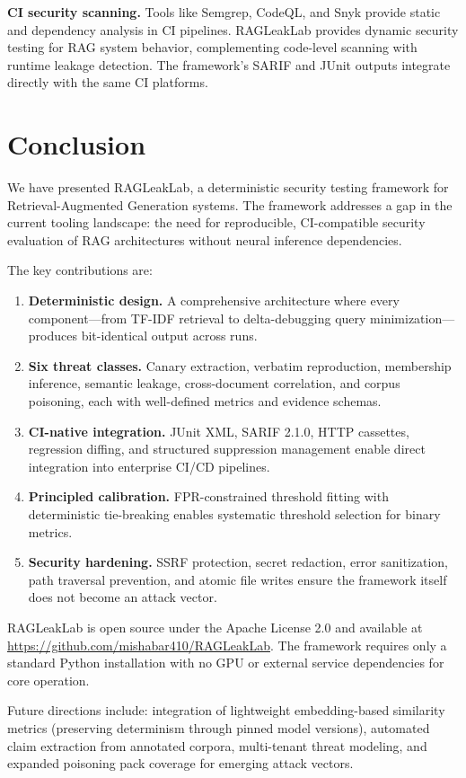 \documentclass[11pt,a4paper]{article}
\begin{document}
\textbf{CI security scanning.} Tools like Semgrep, CodeQL, and Snyk
provide static and dependency analysis in CI pipelines. RAGLeakLab
provides dynamic security testing for RAG system behavior, complementing
code-level scanning with runtime leakage detection. The framework's SARIF
and JUnit outputs integrate directly with the same CI platforms.

\section{Conclusion}\label{sec:conclusion}

We have presented RAGLeakLab, a deterministic security testing framework
for Retrieval-Augmented Generation systems. The framework addresses a gap
in the current tooling landscape: the need for reproducible, CI-compatible
security evaluation of RAG architectures without neural inference
dependencies.

The key contributions are:

\begin{enumerate}[nosep]
  \item \textbf{Deterministic design.} A comprehensive architecture where
        every component---from TF-IDF retrieval to delta-debugging query
        minimization---produces bit-identical output across runs.
  \item \textbf{Six threat classes.} Canary extraction, verbatim
        reproduction, membership inference, semantic leakage, cross-document
        correlation, and corpus poisoning, each with well-defined metrics
        and evidence schemas.
  \item \textbf{CI-native integration.} JUnit XML, SARIF 2.1.0, HTTP
        cassettes, regression diffing, and structured suppression
        management enable direct integration into enterprise CI/CD
        pipelines.
  \item \textbf{Principled calibration.} FPR-constrained threshold
        fitting with deterministic tie-breaking enables systematic
        threshold selection for binary metrics.
  \item \textbf{Security hardening.} SSRF protection, secret redaction,
        error sanitization, path traversal prevention, and atomic file
        writes ensure the framework itself does not become an attack
        vector.
\end{enumerate}

RAGLeakLab is open source under the Apache License 2.0 and available at
\url{https://github.com/mishabar410/RAGLeakLab}. The framework requires
only a standard Python installation with no GPU or external service
dependencies for core operation.

Future directions include: integration of lightweight embedding-based
similarity metrics (preserving determinism through pinned model versions),
automated claim extraction from annotated corpora, multi-tenant threat
modeling, and expanded poisoning pack coverage for emerging attack vectors.
\end{document}
